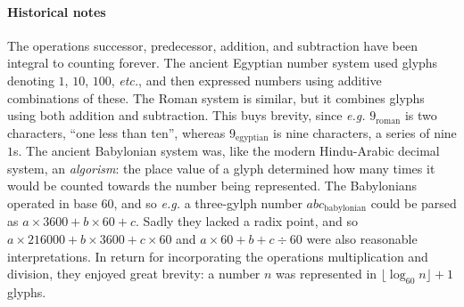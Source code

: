 \label{sec:related}

%


\paragraph*{Historical notes}

The operations successor, predecessor, addition, and subtraction have
been integral to counting forever. The ancient Egyptian
number system used glyphs denoting $1$, $10$, $100$, \emph{etc.},
and then expressed numbers using additive combinations of these.
The Roman system is similar, but
it combines glyphs using both addition and subtraction. This buys brevity,
since \emph{e.g.} $9_{\text{roman}}$ is two characters, ``one less than ten'',
whereas $9_{\text{egyptian}}$ is nine characters, a series of nine $1$s.
The ancient Babylonian system was, like the modern Hindu-Arabic decimal system,
an \emph{algorism}: the place value of a glyph determined how many times it would
be counted towards the number being represented.
The Babylonians operated in
base $60$, and so \emph{e.g.} a three-gylph number $abc_{\text{babylonian}}$ could
be parsed as $a \times 3600 + b \times 60 + c$. Sadly they lacked
a radix point, and so
$a \times 216000 + b \times 3600 + c \times 60$ and $a \times 60 + b + c \div 60$
were also reasonable interpretations. In return for incorporating the operations
multiplication and division, they enjoyed great brevity: a number $n$ was represented in $\lfloor \log_{60}n \rfloor + 1$ glyphs.


